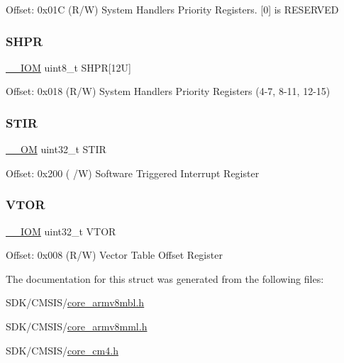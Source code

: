 Offset\+: 0x01C (R/W) System Handlers Priority Registers. \mbox{[}0\mbox{]} is R\+E\+S\+E\+R\+V\+ED \mbox{\label{struct_s_c_b___type_a49f5a554705aebf542765b3a38f4feb9}} 
\subsubsection{\texorpdfstring{S\+H\+PR}{SHPR}\hspace{0.1cm}{\footnotesize\ttfamily [2/2]}}
{\footnotesize\ttfamily \mbox{\hyperlink{core__cm4_8h_ab6caba5853a60a17e8e04499b52bf691}{\+\_\+\+\_\+\+I\+OM}} uint8\+\_\+t S\+H\+PR\mbox{[}12\+U\mbox{]}}

Offset\+: 0x018 (R/W) System Handlers Priority Registers (4-\/7, 8-\/11, 12-\/15) \mbox{\label{struct_s_c_b___type_ada9cbba14ab1cc3fddd585f870932db8}} 
\subsubsection{\texorpdfstring{S\+T\+IR}{STIR}}
{\footnotesize\ttfamily \mbox{\hyperlink{core__cm4_8h_a0ea2009ed8fd9ef35b48708280fdb758}{\+\_\+\+\_\+\+OM}} uint32\+\_\+t S\+T\+IR}

Offset\+: 0x200 ( /W) Software Triggered Interrupt Register \mbox{\label{struct_s_c_b___type_ae457d2615e203c3d5904a43a1bc9df71}} 
\subsubsection{\texorpdfstring{V\+T\+OR}{VTOR}}
{\footnotesize\ttfamily \mbox{\hyperlink{core__cm4_8h_ab6caba5853a60a17e8e04499b52bf691}{\+\_\+\+\_\+\+I\+OM}} uint32\+\_\+t V\+T\+OR}

Offset\+: 0x008 (R/W) Vector Table Offset Register 

The documentation for this struct was generated from the following files\+:\begin{DoxyCompactItemize}
\item 
S\+D\+K/\+C\+M\+S\+I\+S/\mbox{\hyperlink{core__armv8mbl_8h}{core\+\_\+armv8mbl.\+h}}\item 
S\+D\+K/\+C\+M\+S\+I\+S/\mbox{\hyperlink{core__armv8mml_8h}{core\+\_\+armv8mml.\+h}}\item 
S\+D\+K/\+C\+M\+S\+I\+S/\mbox{\hyperlink{core__cm4_8h}{core\+\_\+cm4.\+h}}\end{DoxyCompactItemize}
